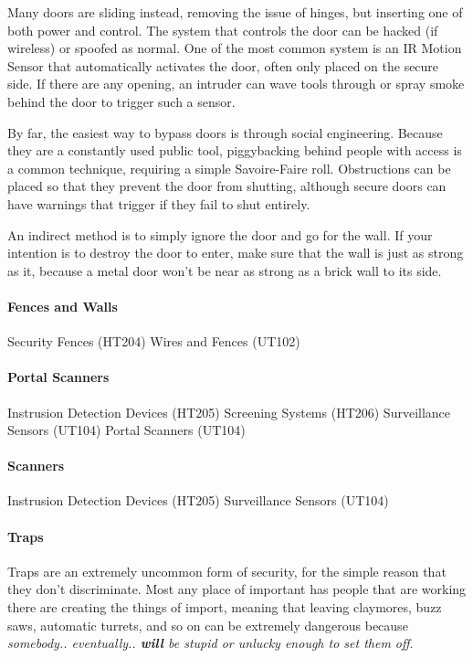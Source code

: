 \begin{multicols*}{2}
	Many doors are sliding instead, removing the issue of hinges, but inserting one of both power and control. The system that controls the door can be hacked (if wireless) or spoofed as normal. One of the most common system is an IR Motion Sensor that automatically activates the door, often only placed on the secure side. If there are any opening, an intruder can wave tools through or spray smoke behind the door to trigger such a sensor. 
	
	By far, the easiest way to bypass doors is through social engineering. Because they are a constantly used public tool, piggybacking behind people with access is a common technique, requiring a simple Savoire-Faire roll. Obstructions can be placed so that they prevent the door from shutting, although secure doors can have warnings that trigger if they fail to shut entirely.
	
	An indirect method is to simply ignore the door and go for the wall. If your intention is to destroy the door to enter, make sure that the wall is just as strong as it, because a metal door won't be near as strong as a brick wall to its side.
	
	\paragraph{Fences and Walls}
	
	Security Fences (HT204)
	Wires and Fences (UT102)
	
	\paragraph{Portal Scanners}
	
	Instrusion Detection Devices (HT205)
	Screening Systems (HT206)
	Surveillance Sensors (UT104)
	Portal Scanners (UT104)
	
	\paragraph{Scanners}
	
	Instrusion Detection Devices (HT205)
	Surveillance Sensors (UT104)
	
	
	\paragraph{Traps}
	
	Traps are an extremely uncommon form of security, for the simple reason that they don't discriminate. Most any place of important has people that are working there are creating the things of import, meaning that leaving claymores, buzz saws, automatic turrets, and so on can be extremely dangerous because \textit{somebody.. eventually.. \textbf{will} be stupid or unlucky enough to set them off}.
	

\end{multicols*}
